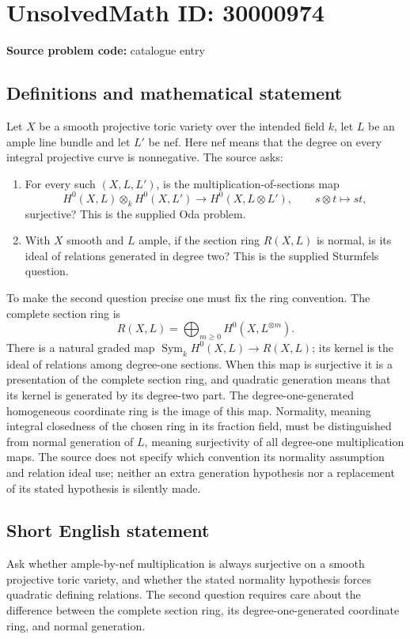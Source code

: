 \documentclass[11pt]{article}
\begin{document}
\section*{UnsolvedMath ID: 30000974}
\textbf{Source problem code:} catalogue entry
\subsection{Definitions and mathematical statement}
Let \(X\) be a smooth projective toric variety over the intended field \(k\), let \(L\) be an ample line bundle and let \(L'\) be nef. Here nef means that the degree on every integral projective curve is nonnegative. The source asks:
\begin{enumerate}
\item For every such \((X,L,L')\), is the multiplication-of-sections map
\[
H^0(X,L)\otimes_k H^0(X,L')\longrightarrow H^0(X,L\otimes L'),
\qquad s\otimes t\longmapsto st,
\]
surjective? This is the supplied Oda problem.
\item With \(X\) smooth and \(L\) ample, if the section ring \(R(X,L)\) is normal, is its ideal of relations generated in degree two? This is the supplied Sturmfels question.
\end{enumerate}
To make the second question precise one must fix the ring convention. The complete section ring is
\[
R(X,L)=\bigoplus_{m\geq0}H^0(X,L^{\otimes m}).
\]
There is a natural graded map \(\operatorname{Sym}_k H^0(X,L)\to R(X,L)\); its kernel is the ideal of relations among degree-one sections. When this map is surjective it is a presentation of the complete section ring, and quadratic generation means that its kernel is generated by its degree-two part. The degree-one-generated homogeneous coordinate ring is the image of this map. Normality, meaning integral closedness of the chosen ring in its fraction field, must be distinguished from normal generation of \(L\), meaning surjectivity of all degree-one multiplication maps. The source does not specify which convention its normality assumption and relation ideal use; neither an extra generation hypothesis nor a replacement of its stated hypothesis is silently made.
\subsection{Short English statement}
Ask whether ample-by-nef multiplication is always surjective on a smooth projective toric variety, and whether the stated normality hypothesis forces quadratic defining relations. The second question requires care about the difference between the complete section ring, its degree-one-generated coordinate ring, and normal generation.
\end{document}
